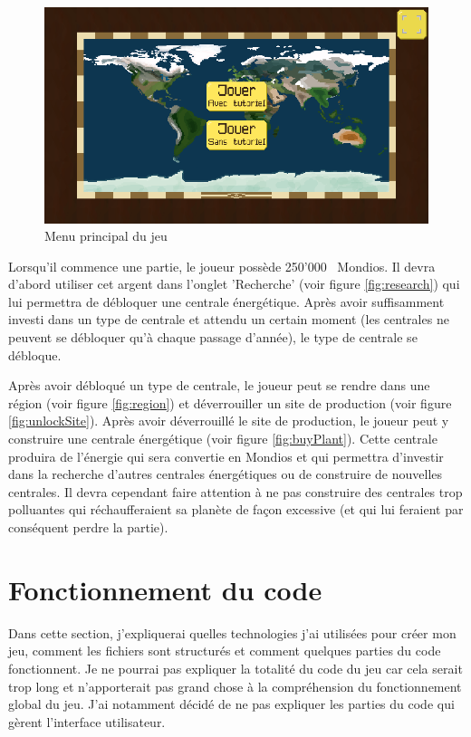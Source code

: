 \documentclass{article}
\newcommand{\initMoney}{250'000}
\begin{document}
        \begin{figure}[H]
                \includegraphics[width=\linewidth]{../images/mainMenu}
                \caption{Menu principal du jeu}
                \label{fig:mainMenu}
        \end{figure}
        
        Lorsqu'il commence une partie, le joueur possède \initMoney ~ Mondios. Il devra d'abord utiliser cet argent dans l'onglet 'Recherche' (voir figure \ref{fig:research}) qui lui permettra de débloquer une centrale énergétique. Après avoir suffisamment investi dans un type de centrale et attendu un certain moment (les centrales ne peuvent se débloquer qu'à chaque passage d'année), le type de centrale se débloque.
        
        
        Après avoir débloqué un type de centrale, le joueur peut se rendre dans une région (voir figure \ref{fig:region}) et déverrouiller un site de production (voir figure \ref{fig:unlockSite}). Après avoir déverrouillé le site de production, le joueur peut y construire une centrale énergétique (voir figure \ref{fig:buyPlant}). Cette centrale produira de l'énergie qui sera convertie en Mondios et qui permettra d'investir dans la recherche d'autres centrales énergétiques ou de construire de nouvelles centrales. Il devra cependant faire attention à ne pas construire des centrales trop polluantes qui réchaufferaient sa planète de façon excessive (et qui lui feraient par conséquent perdre la partie).
        

        \section{Fonctionnement du code}
        Dans cette section, j'expliquerai quelles technologies j'ai utilisées pour créer mon jeu, comment les fichiers sont structurés et comment quelques parties du code fonctionnent. Je ne pourrai pas expliquer la totalité du code du jeu car cela serait trop long et n'apporterait pas grand chose à la compréhension du fonctionnement global du jeu. J'ai notamment décidé de ne pas expliquer les parties du code qui gèrent l'interface utilisateur.
        
\end{document}

